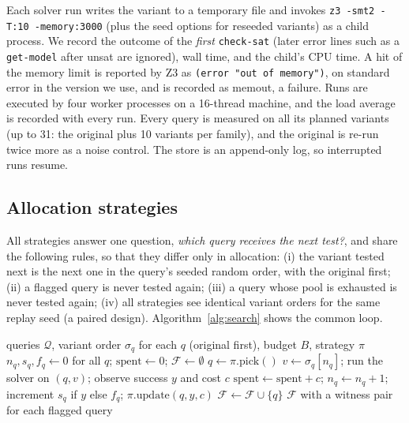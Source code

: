 \documentclass[11pt]{article}
\newcommand{\unsat}{\textsf{unsat}}
\newcommand{\Q}{\mathcal{Q}}
\begin{document}
Each solver run writes the variant to a temporary file and invokes \texttt{z3 -smt2 -T:10 -memory:3000} (plus the seed options for reseeded variants) as a child process. We record the outcome of the \emph{first} \texttt{check-sat} (later error lines such as a \texttt{get-model} after \unsat{} are ignored), wall time, and the child's CPU time. A hit of the memory limit is reported by Z3 as \texttt{(error "out of memory")}, on standard error in the version we use, and is recorded as \textsf{memout}, a failure. Runs are executed by four worker processes on a 16-thread machine, and the load average is recorded with every run. Every query is measured on all its planned variants (up to 31: the original plus 10 variants per family), and the original is re-run twice more as a noise control. The store is an append-only log, so interrupted runs resume.

\subsection{Allocation strategies}
\label{sec:strategies}

All strategies answer one question, \emph{which query receives the next test?}, and share the following rules, so that they differ only in allocation: (i) the variant tested next is the next one in the query's seeded random order, with the original first; (ii) a flagged query is never tested again; (iii) a query whose pool is exhausted is never tested again; (iv) all strategies see identical variant orders for the same replay seed (a paired design). Algorithm~\ref{alg:search} shows the common loop.

\begin{algorithm}[t]
\caption{Budgeted witness search (shared by all strategies)}
\label{alg:search}
\begin{algorithmic}[1]
\Require queries $\Q$, variant order $\sigma_q$ for each $q$ (original first), budget $B$, strategy $\pi$
\State $n_q,s_q,f_q\gets 0$ for all $q$;\; $\mathrm{spent}\gets 0$;\; $\mathcal{F}\gets\emptyset$
  \State $q\gets \pi.\mathrm{pick}()$
  \State $v\gets\sigma_q[n_q]$;\; run the solver on $(q,v)$;\; observe success $y$ and cost $c$
  \State $\mathrm{spent}\gets \mathrm{spent}+c$;\; $n_q\gets n_q+1$;\; increment $s_q$ if $y$ else $f_q$;\; $\pi.\mathrm{update}(q,y,c)$
   $\mathcal F\gets\mathcal F\cup\{q\}$ \EndIf
\EndWhile
\State \Return $\mathcal F$ with a witness pair for each flagged query
\end{algorithmic}
\end{algorithm}
\end{document}

